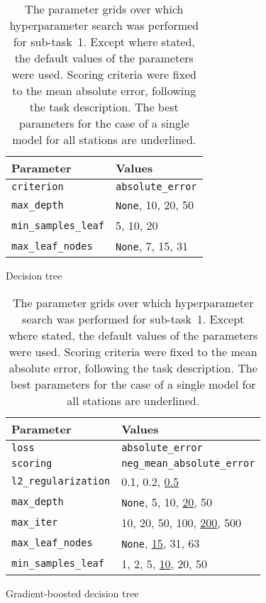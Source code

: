 \documentclass[11pt]{extarticle}
\newcommand{\None}{\texttt{None}}
\begin{document}
\begin{table}
  \centering
  \begin{subfigure}{\textwidth}
    \centering
    \begin{tabular}{ll}
      \toprule
      Parameter                   & Values
      \\
      \midrule
      \texttt{criterion}          & \texttt{absolute\_error}
      \\
      \midrule
      \texttt{max\_depth}         & \None, 10, 20, 50
      \\
      \texttt{min\_samples\_leaf} & 5, 10, 20
      \\
      \texttt{max\_leaf\_nodes}   & \None, 7, 15, 31
      \\
      \bottomrule
    \end{tabular}
    \caption{Decision tree}
    \label{tab:chart-parameters-subtask-1-1}
  \end{subfigure}
  \par\bigskip\bigskip
  \begin{subfigure}{\textwidth}
    \centering
    \begin{tabular}{ll}
      \toprule
      Parameter                   & Values
      \\
      \midrule
      \texttt{loss}               & \texttt{absolute\_error}
      \\
      \texttt{scoring}            & \texttt{neg\_mean\_absolute\_error}
      \\
      \midrule
      \texttt{l2\_regularization} & 0.1, 0.2, \underline{0.5}
      \\
      \texttt{max\_depth}         & \None, 5, 10, \underline{20}, 50
      \\
      \texttt{max\_iter}          & 10, 20, 50, 100, \underline{200}, 500
      \\
      \texttt{max\_leaf\_nodes}   & \None, \underline{15}, 31, 63
      \\
      \texttt{min\_samples\_leaf} & 1, 2, 5, \underline{10}, 20, 50
      \\
      \bottomrule
    \end{tabular}
    \caption{Gradient-boosted decision tree}
    \label{tab:chart-parameters-subtask-1-2}
  \end{subfigure}
  \caption{The parameter grids over which hyperparameter search was performed for sub-task~1.
    Except where stated, the default values of the parameters were used.
    Scoring criteria were fixed to the mean absolute error, following the task description.
    The best parameters for the case of a single model for all stations are underlined.
  }
  \label{tab:chart-parameters-subtask-1}
\end{table}
\end{document}
